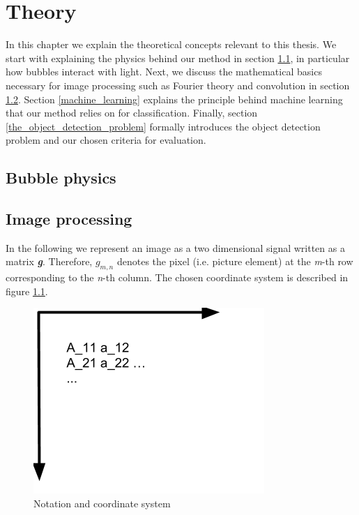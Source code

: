 \chapter{Theory}
In this chapter we explain the theoretical concepts relevant to this thesis. We start with explaining the physics behind our method in section \ref{bubble_physics}, in particular how bubbles interact with light. Next, we discuss the mathematical basics necessary for image processing such as Fourier theory and convolution in section \ref{image_processing}. Section \ref{machine_learning} explains the principle behind machine learning that our method relies on for classification. Finally, section \ref{the_object_detection_problem} formally introduces the object detection problem and our chosen criteria for evaluation. 

	\section{Bubble physics} \label{bubble_physics}
	
	\section{Image processing}	\label{image_processing}
	In the following we represent an image as a two dimensional signal written as a matrix \textit{\textbf{g}}. Therefore, $g_{m,n}$ denotes the pixel (i.e. picture element) at the \textit{m}-th row corresponding to the \textit{n}-th column. The chosen coordinate system is described in figure \ref{fig:coord_sys}. 
	
		\begin{figure}
		    \centering
		    \includegraphics[scale=0.4]{images/coord_sys.png}
		    \caption{Notation and coordinate system}
		    \label{fig:coord_sys}
		\end{figure}
	
